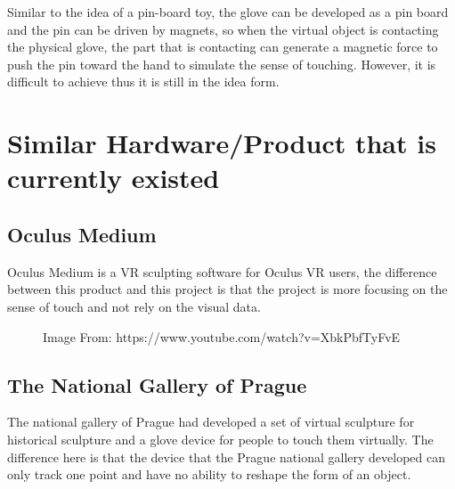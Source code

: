 \documentclass[12pt,a4paper]{report}
\begin{document}
Similar to the idea of a pin-board toy, the glove can be developed as a pin board and the pin can be driven by magnets, so when the virtual object is contacting the physical glove, the part that is contacting can generate a magnetic force to push the pin toward the hand to simulate the sense of touching. However, it is difficult to achieve thus it is still in the idea form. 

\section{Similar Hardware/Product that is currently existed}

\subsection{Oculus Medium}

Oculus Medium is a VR sculpting software for Oculus VR users, the difference between this product and this project is that the project is more focusing on the sense of touch and not rely on the visual data. 

\begin{figure}[H]
    \centering
	\caption{Image From: https://www.youtube.com/watch?v=XbkPbfTyFvE}
	\label{fig:full}
\end{figure}

\subsection{The National Gallery of Prague}

The national gallery of Prague had developed a set of virtual sculpture for historical sculpture and a glove device for people to touch them virtually. The difference here is that the device that the Prague national gallery developed can only track one point and have no ability to reshape the form of an object. 


\newpage



\end{document}
